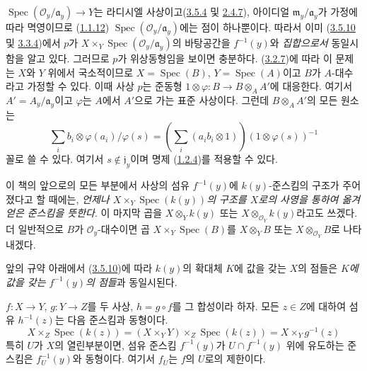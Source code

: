 $\operatorname{Spec}(\mathscr{O}_y/\mathfrak{a}_y)\to Y$는 라디시엘
사상이고(\hyperref[I.3.5.4-ko]{3.5.4} 및
\hyperref[I.2.4.7-ko]{2.4.7}), 아이디얼
$\mathfrak{m}_y/\mathfrak{a}_y$가 가정에 따라 멱영이므로
(\hyperref[I.1.1.12-ko]{1.1.12})
$\operatorname{Spec}(\mathscr{O}_y/\mathfrak{a}_y)$에는 점이 하나뿐이다.
따라서 이미 (\hyperref[I.3.5.10-ko]{3.5.10} 및
\hyperref[I.3.3.4-ko]{3.3.4})에서 $p$가
$X\times_Y\operatorname{Spec}(\mathscr{O}_y/\mathfrak{a}_y)$의
바탕공간을 $f^{-1}(y)$와 \emph{집합으로서} 동일시함을 알고 있다.
그러므로 $p$가 위상동형임을 보이면 충분하다.
(\hyperref[I.3.2.7-ko]{3.2.7})에 따라 이 문제는 $X$와 $Y$ 위에서
국소적이므로 $X=\operatorname{Spec}(B)$,
$Y=\operatorname{Spec}(A)$이고 $B$가 $A$-대수라고 가정할 수 있다.
이때 사상 $p$는 준동형
$1\otimes\varphi:B\to B\otimes_A A'$에 대응한다. 여기서
$A'=A_y/\mathfrak{a}_y$이고 $\varphi$는 $A$에서 $A'$으로 가는 표준
사상이다. 그런데 $B\otimes_A A'$의 모든 원소는
\label{I.3.6.1.localization-fraction-ko}
\[
  \sum_i b_i\otimes\varphi(a_i)/\varphi(s)
  =\left(\sum_i(a_i b_i\otimes 1)\right)(1\otimes\varphi(s))^{-1}
\]
꼴로 쓸 수 있다. 여기서 $s\notin\mathfrak{j}_y$이며 명제
(\hyperref[I.1.2.4-ko]{1.2.4})를 적용할 수 있다.

\begin{env}[3.6.2]
\label{I.3.6.2-ko}
이 책의 앞으로의 모든 부분에서 사상의 섬유 $f^{-1}(y)$에
$k(y)$-준스킴의 구조가 주어졌다고 할 때에는,
\emph{언제나 $X\times_Y\operatorname{Spec}(k(y))$의 구조를 $X$로의
사영을 통하여 옮겨 얻은 준스킴을 뜻한다}. 이 마지막 곱을
$X\otimes_Y k(y)$ 또는 $X\otimes_{\mathscr{O}_Y}k(y)$라고도 쓰겠다.
더 일반적으로 $B$가 $\mathscr{O}_y$-대수이면 곱
$X\times_Y\operatorname{Spec}(B)$를 $X\otimes_Y B$ 또는
$X\otimes_{\mathscr{O}_Y}B$로 나타내겠다.
\end{env}

앞의 규약 아래에서 (\hyperref[I.3.5.10-ko]{3.5.10})에 따라
$k(y)$의 확대체 $K$에 값을 갖는 $X$의 점들은
\emph{$K$에 값을 갖는 $f^{-1}(y)$의 점들}과 동일시된다.

\begin{env}[3.6.3]
\label{I.3.6.3-ko}
$f:X\to Y$, $g:Y\to Z$를 두 사상, $h=g\circ f$를 그 합성이라 하자.
모든 $z\in Z$에 대하여 섬유 $h^{-1}(z)$는 다음 준스킴과 동형이다.
\label{I.3.6.3.fibre-composition-ko}
\[
  X\times_Z\operatorname{Spec}(k(z))
  =(X\times_Y Y)\times_Z\operatorname{Spec}(k(z))
  =X\times_Y g^{-1}(z)
\]
특히 $U$가 $X$의 열린부분이면, 섬유 준스킴 $f^{-1}(y)$가
$U\cap f^{-1}(y)$ 위에 유도하는 준스킴은 $f_U^{-1}(y)$와 동형이다.
여기서 $f_U$는 $f$의 $U$로의 제한이다.
\end{env}

